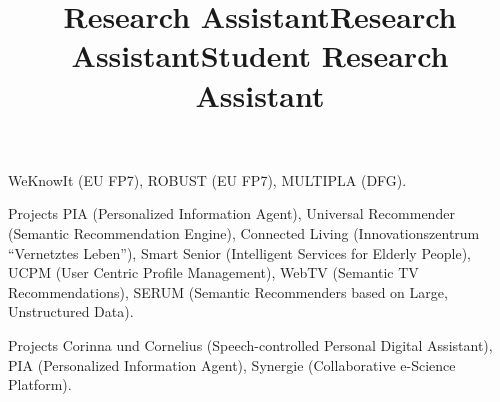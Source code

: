 \documentclass[line,mm]{res}
\begin{document}
\begin{resume}
\title{\bf Research Assistant}
\begin{position}
  WeKnowIt (EU FP7), ROBUST (EU FP7), MULTIPLA (DFG).
\end{position}

\title{\bf Research Assistant}
\begin{position}
Projects PIA (Personalized Information Agent), Universal Recommender
(Semantic Recommendation Engine), Connected Living (Innovationszentrum
``Vernetztes Leben''), Smart Senior (Intelligent Services for Elderly People),
UCPM (User Centric Profile Management), WebTV (Semantic TV
Recommendations), SERUM (Semantic Recommenders based on Large,
Unstructured Data).    
\end{position}

\title{\bf Student Research Assistant}
\begin{position}
Projects Corinna und Cornelius (Speech-controlled Personal Digital
Assistant), PIA (Personalized Information Agent), Synergie
(Collaborative e-Science Platform).  
\end{position}


\end{resume}
\end{document}
